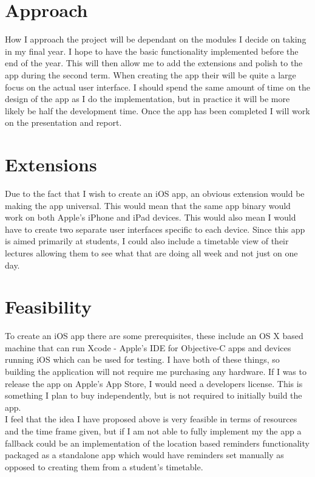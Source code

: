 \documentclass[12pt]{article}
\begin{document}
\section*{Approach}
How I approach the project will be dependant on the modules I decide on taking in my final year. I hope to have the basic functionality implemented before the end of the year. This will then allow me to add the extensions and polish to the app during the second term. When creating the app their will be quite a large focus on the actual user interface. I should spend the same amount of time on the design of the app as I do the implementation, but in practice it will be more likely be half the development time. Once the app has been completed I will work on the presentation and report.

\section*{Extensions}
Due to the fact that I wish to create an iOS app, an obvious extension would be making the app universal. This would mean that the same app binary would work on both Apple's iPhone and iPad devices. This would also mean I would have to create two separate user interfaces specific to each device. Since this app is aimed primarily at students, I could also include a timetable view of their lectures allowing them to see what that are doing all week and not just on one day.

\section*{Feasibility}
To create an iOS app there are some prerequisites, these include an OS X based machine that can run Xcode - Apple's IDE for Objective-C apps and devices running iOS which can be used for testing. I have both of these things, so building the application will not require me purchasing any hardware. If I was to release the app on Apple's App Store, I would need a developers license. This is something I plan to buy independently, but is not required to initially build the app.\\ I feel that the idea I have proposed above is very feasible in terms of resources and the time frame given, but if I am not able to fully implement my the app a fallback could be an implementation of the location based reminders functionality packaged as a standalone app which would have reminders set manually as opposed to creating them from a student's timetable. 
\end{document}
